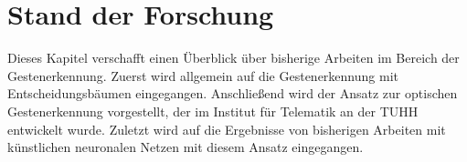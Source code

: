 \chapter{Stand der Forschung}
Dieses Kapitel verschafft einen Überblick über bisherige Arbeiten im Bereich der Gestenerkennung. Zuerst wird allgemein auf die Gestenerkennung mit Entscheidungsbäumen eingegangen. Anschließend wird der Ansatz
zur optischen Gestenerkennung vorgestellt, der im Institut für Telematik an der TUHH entwickelt wurde. Zuletzt wird auf die Ergebnisse von bisherigen Arbeiten mit künstlichen neuronalen Netzen mit diesem Ansatz eingegangen.


